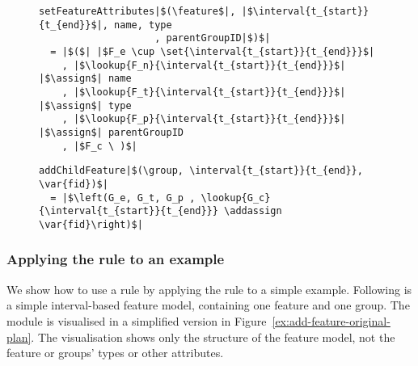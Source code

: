 \begin{figure}[h]
  \begin{verbatim}
setFeatureAttributes|$(\feature$|, |$\interval{t_{start}}{t_{end}}$|, name, type
                    , parentGroupID|$)$|
  = |$($| |$F_e \cup \set{\interval{t_{start}}{t_{end}}}$|
    , |$\lookup{F_n}{\interval{t_{start}}{t_{end}}}$| |$\assign$| name
    , |$\lookup{F_t}{\interval{t_{start}}{t_{end}}}$| |$\assign$| type
    , |$\lookup{F_p}{\interval{t_{start}}{t_{end}}}$| |$\assign$| parentGroupID
    , |$F_c \ )$|
   \end{verbatim}
  \caption{}
  \label{fun:set-feature-attributes}
\end{figure}

\begin{figure}[h]
  \begin{verbatim}
addChildFeature|$(\group, \interval{t_{start}}{t_{end}}, \var{fid})$|
  = |$\left(G_e, G_t, G_p , \lookup{G_c}{\interval{t_{start}}{t_{end}}} \addassign \var{fid}\right)$|
  \end{verbatim}
  \caption{}
  \label{fun:add-child-feature}
\end{figure}

\subsubsection{Applying the  rule to an example}

We show how to use a rule by applying the  rule to a simple example. Following is a simple interval-based feature model, containing one feature and one group. The module is visualised in a simplified version in Figure~\vref{ex:add-feature-original-plan}. The visualisation shows only the structure of the feature model, not the feature or groups' types or other attributes.

